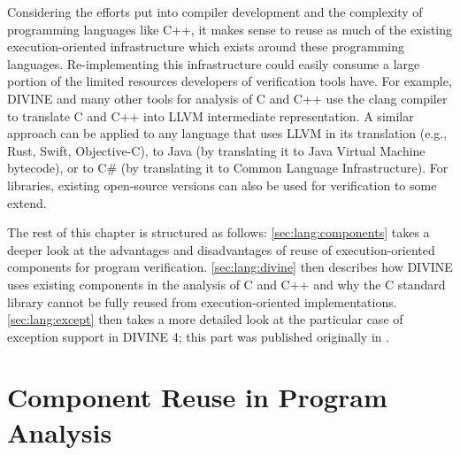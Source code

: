 Considering the efforts put into compiler development and the complexity of
programming languages like C++, it makes sense to reuse as much of the existing
execution-oriented infrastructure which exists around these programming
languages.
Re-implementing this infrastructure could easily consume a large portion of the
limited resources developers of verification tools have.
For example, DIVINE and many other tools for analysis of C and C++ use the
clang compiler to translate C and C++ into LLVM intermediate representation.
A similar approach can be applied to any language that uses LLVM in its
translation (e.g., Rust, Swift, Objective-C), to Java (by translating it to
Java Virtual Machine bytecode), or to C\# (by translating it to Common Language
Infrastructure).
For libraries, existing open-source versions can also be used for verification to some extend.

The rest of this chapter is structured as follows: \autoref{sec:lang:components} takes a deeper look at the advantages and disadvantages of reuse of execution-oriented components for program verification.
\autoref{sec:lang:divine} then describes how DIVINE uses existing components in the analysis of C and C++ and why the C standard library cannot be fully reused from execution-oriented implementations.
\autoref{sec:lang:except} then takes a more detailed look at the particular case of exception support in DIVINE 4; this part was published originally in .


\section{Component Reuse in Program Analysis}\label{sec:lang:components}

